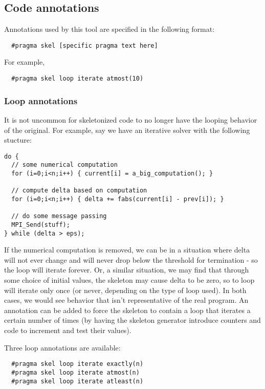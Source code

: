 \documentclass{article}
\begin{document}
\subsection{Code annotations}

Annotations used by this tool are specified in the following format:

\begin{verbatim}
  #pragma skel [specific pragma text here]
\end{verbatim}

For example,

\begin{verbatim}
  #pragma skel loop iterate atmost(10)
\end{verbatim}

\subsubsection{Loop annotations}

It is not uncommon for skeletonized code to no longer have the looping
behavior of the original.  For example, say we have an iterative
solver with the following stucture:

\begin{verbatim}
do {
  // some numerical computation
  for (i=0;i<n;i++) { current[i] = a_big_computation(); }

  // compute delta based on computation
  for (i=0;i<n;i++) { delta += fabs(current[i] - prev[i]); }

  // do some message passing
  MPI_Send(stuff);
} while (delta > eps);
\end{verbatim}

If the numerical computation is removed, we can be in a situation
where delta will not ever change and will never drop below the
threshold for termination - so the loop will iterate forever.  Or, a
similar situation, we may find that through some choice of initial
values, the skeleton may cause delta to be zero, so to loop will
iterate only once (or never, depending on the type of loop used).  In
both cases, we would see behavior that isn't representative of the
real program.  An annotation can be added to force the skeleton to
contain a loop that iterates a certain number of times  (by having
the skeleton generator introduce counters and code to increment and
test their values).

Three loop annotations are available:

\begin{verbatim}
  #pragma skel loop iterate exactly(n)
  #pragma skel loop iterate atmost(n)
  #pragma skel loop iterate atleast(n)
\end{verbatim}
\end{document}
